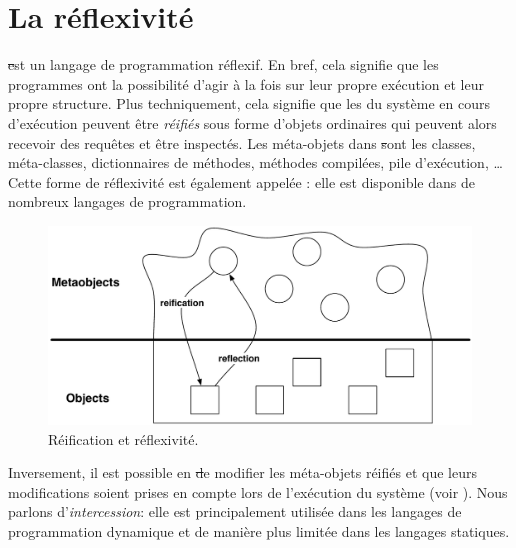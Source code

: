 \documentclass[a4paper,10pt,twoside]{book}
\begin{document}
	\renewcommand{\nnbb}[2]{} %
	\sloppy
\fi

\chapter{La réflexivité}


\st est un langage de programmation réflexif. En bref, cela signifie que les programmes ont la possibilité d'agir à la fois sur leur propre exécution et leur propre structure.
Plus techniquement, cela signifie que les  du système en cours d'exécution peuvent être \emph{réifiés} sous forme d'objets ordinaires qui peuvent alors recevoir des requêtes et être inspectés.
Les méta-objets dans \st sont les classes, méta-classes, dictionnaires de méthodes, méthodes compilées, pile d'exécution, \etc\ldots
Cette forme de réflexivité est également appelée : elle est disponible dans de nombreux langages de programmation.

\begin{figure}[ht]\centering
	\includegraphics[width=\linewidth]{reflect}
	\caption{Réification et réflexivité.} %
\end{figure}
Inversement, il est possible en \st de modifier les méta-objets réifiés et que leurs modifications soient prises en compte lors de l'exécution du système (voir ).
Nous parlons d'\emph{intercession}: elle est principalement utilisée dans les langages de programmation dynamique et de manière plus limitée dans les langages statiques.
\end{document}
